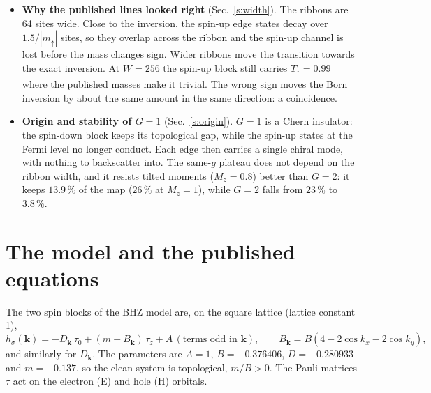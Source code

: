 \documentclass[11pt,a4paper]{article}
\newcommand{\up}{{\uparrow}}
\begin{document}
\begin{itemize}
\begin{itemize}
  \end{itemize}
\item \textbf{Why the published lines looked right} (Sec.~\ref{s:width}). The ribbons are 64
  sites wide. Close to the inversion, the spin-up edge states decay over $1.5/|\bar m_\up|$
  sites, so they overlap across the ribbon and the spin-up channel is lost before the mass
  changes sign. Wider ribbons move the transition towards the exact inversion. At $W=256$ the
  spin-up block still carries $T_\up=0.99$ where the published masses make it trivial. The
  wrong sign moves the Born inversion by about the same amount in the same direction: a
  coincidence.
\item \textbf{Origin and stability of $G=1$} (Sec.~\ref{s:origin}). $G=1$ is a Chern
  insulator: the spin-down block keeps its topological gap, while the spin-up states at the
  Fermi level no longer conduct. Each edge then carries a single chiral mode, with nothing to
  backscatter into. The same-$g$ plateau does not depend on the ribbon width, and it resists
  tilted moments ($M_z=0.8$) better than $G=2$: it keeps $13.9\,\%$ of the map ($26\,\%$ at
  $M_z=1$), while $G=2$ falls from $23\,\%$ to $3.8\,\%$.
\end{itemize}

\section{The model and the published equations}\label{s:model}

The two spin blocks of the BHZ model are, on the square lattice (lattice constant 1),
\begin{equation}
h_\sigma(\bm k) = -D_{\bm k}\,\tau_0 + (m - B_{\bm k})\,\tau_z + A\,(\text{terms odd in }\bm k),
\qquad B_{\bm k} = B(4-2\cos k_x-2\cos k_y),
\label{e:h}
\end{equation}
and similarly for $D_{\bm k}$. The parameters are $A=1$, $B=-0.376406$, $D=-0.280933$ and
$m=-0.137$, so the clean system is topological, $m/B>0$. The Pauli matrices $\tau$ act on the
electron (E) and hole (H) orbitals.
\end{document}
